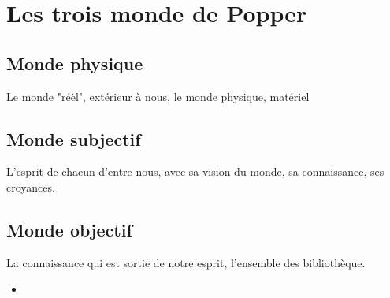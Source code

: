 

\section{Les trois monde de Popper}

  \subsection{Monde physique}
Le monde "réèl", extérieur à nous, le monde physique, matériel

  \subsection{Monde subjectif}
L'esprit de chacun d'entre nous, avec sa vision du monde, sa connaissance, ses croyances.

  \subsection{Monde objectif}
La connaissance qui est sortie de notre esprit, l'ensemble des bibliothèque.

	\begin{itemize}[leftmargin=1cm, label=, itemsep=1pt]
		\item 
	\end{itemize}



